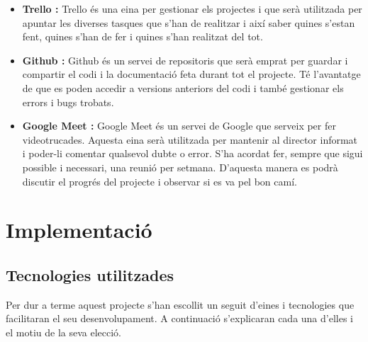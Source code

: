 \documentclass[a4paper]{article}
\begin{document}
\begin{itemize}
    \item \textbf{Trello \cite{Trello}:} Trello és una eina per gestionar els projectes i que serà utilitzada per apuntar les diverses tasques que s'han de realitzar i així saber quines s'estan fent, quines s'han de fer i quines s'han realitzat del tot.
    
    \item \textbf{Github \cite{Github}:} Github és un servei de repositoris que serà emprat per guardar i compartir el codi i la documentació feta durant tot el projecte. Té l'avantatge de que es poden accedir a versions anteriors del codi i també gestionar els errors i bugs trobats.
    
    \item \textbf{Google Meet \cite{GoogleMeet}:} Google Meet és un servei de Google que serveix per fer videotrucades. Aquesta eina serà utilitzada per mantenir al director informat i poder-li comentar qualsevol dubte o error. S'ha acordat fer, sempre que sigui possible i necessari, una reunió per setmana. D'aquesta manera es podrà discutir el progrés del projecte i observar si es va pel bon camí.
\end{itemize}

\newpage
\section{Implementació}
\subsection{Tecnologies utilitzades}
Per dur a terme aquest projecte s'han escollit un seguit d'eines i tecnologies que facilitaran el seu desenvolupament. A continuació s'explicaran cada una d'elles i el motiu de la seva elecció.
\end{document}
